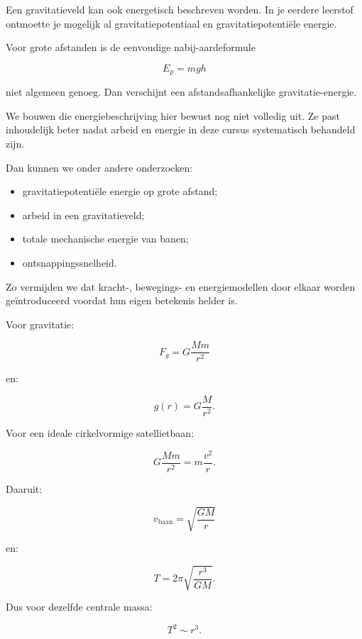 \documentclass{ximera}
\begin{document}

Een gravitatieveld kan ook energetisch beschreven worden. In je eerdere
leerstof ontmoette je mogelijk al gravitatiepotentiaal en
gravitatiepotentiële energie.

Voor grote afstanden is de eenvoudige nabij-aardeformule

\[
E_{p}=mgh
\]

niet algemeen genoeg. Dan verschijnt een afstandsafhankelijke
gravitatie-energie.

We bouwen die energiebeschrijving hier bewust nog niet volledig uit.
Ze past inhoudelijk beter nadat arbeid en energie in deze cursus
systematisch behandeld zijn.

Dan kunnen we onder andere onderzoeken:

\begin{itemize}
  \item gravitatiepotentiële energie op grote afstand;
  \item arbeid in een gravitatieveld;
  \item totale mechanische energie van banen;
  \item ontsnappingssnelheid.
\end{itemize}

Zo vermijden we dat kracht-, bewegings- en energiemodellen door elkaar
worden geïntroduceerd voordat hun eigen betekenis helder is.




Voor gravitatie:

\[
\boxed{
F_g=G\frac{Mm}{r^2}
}
\]

en:

\[
\boxed{
g(r)=G\frac{M}{r^2}.
}
\]

Voor een ideale cirkelvormige satellietbaan:

\[
G\frac{Mm}{r^2}
=
m\frac{v^2}{r}.
\]

Daaruit:

\[
\boxed{
v_{\mathrm{baan}}
=
\sqrt{\frac{GM}{r}}
}
\]

en:

\[
\boxed{
T
=
2\pi\sqrt{\frac{r^3}{GM}}.
}
\]

Dus voor dezelfde centrale massa:

\[
\boxed{
T^2\sim r^3.
}
\]
\end{document}

